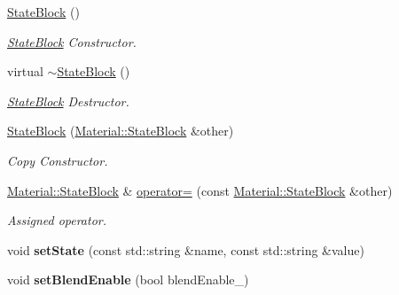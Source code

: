 \begin{DoxyCompactItemize}
\item 
\hyperlink{class_i_dream_sky_1_1_material_1_1_state_block_aeeb8bcab6671808d46ad78b1dbb72cd1}{State\+Block} ()
\begin{DoxyCompactList}\small\item\em \hyperlink{class_i_dream_sky_1_1_material_1_1_state_block}{State\+Block} Constructor. \end{DoxyCompactList}\item 
virtual \hyperlink{class_i_dream_sky_1_1_material_1_1_state_block_ac28531650d7c81a4d7671dfdde4354c8}{$\sim$\+State\+Block} ()
\begin{DoxyCompactList}\small\item\em \hyperlink{class_i_dream_sky_1_1_material_1_1_state_block}{State\+Block} Destructor. \end{DoxyCompactList}\item 
\hyperlink{class_i_dream_sky_1_1_material_1_1_state_block_a5fa5631f46632acb9af1ae8b7fe358ad}{State\+Block} (\hyperlink{class_i_dream_sky_1_1_material_1_1_state_block}{Material\+::\+State\+Block} \&other)
\begin{DoxyCompactList}\small\item\em Copy Constructor. \end{DoxyCompactList}\item 
\hyperlink{class_i_dream_sky_1_1_material_1_1_state_block}{Material\+::\+State\+Block} \& \hyperlink{class_i_dream_sky_1_1_material_1_1_state_block_a19f6516728b90762ee945d288384b052}{operator=} (const \hyperlink{class_i_dream_sky_1_1_material_1_1_state_block}{Material\+::\+State\+Block} \&other)
\begin{DoxyCompactList}\small\item\em Assigned operator. \end{DoxyCompactList}\item 
void {\bfseries set\+State} (const std\+::string \&name, const std\+::string \&value)\hypertarget{class_i_dream_sky_1_1_material_1_1_state_block_a0f24e6fd11397d5246d5103725d2d0dc}{}\label{class_i_dream_sky_1_1_material_1_1_state_block_a0f24e6fd11397d5246d5103725d2d0dc}

\item 
void {\bfseries set\+Blend\+Enable} (bool blend\+Enable\+\_\+)\hypertarget{class_i_dream_sky_1_1_material_1_1_state_block_a9d01c7bfc3fc35c65658130e8ac4b5e9}{}\label{class_i_dream_sky_1_1_material_1_1_state_block_a9d01c7bfc3fc35c65658130e8ac4b5e9}


\end{DoxyCompactItemize}
